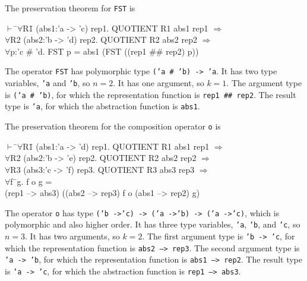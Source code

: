 \documentclass[envcountsame,runningheads]{llncs}
\begin{document}
The preservation theorem for {\tt FST} is
{\tt \begin{tabbing}
\hspace{5.5mm}
    $\vdash$ \=$\forall$R\=1 (abs1:'a -> 'c) rep1. QUOTIENT R1 abs1 rep1 $\Rightarrow$ \\
\>     $\forall$R2 (abs2:'b -> 'd) rep2. QUOTIENT R2 abs2 rep2 $\Rightarrow$ \\
\>\>     $\forall$p:'c \# 'd. FST p = abs1 (FST ((rep1 \#\# rep2) p))
\end{tabbing}}
The operator {\tt FST} has polymorphic type {\tt ('a \# 'b) -> 'a}.
It has two type variables, {\tt 'a} and {\tt 'b}, so $n = 2$.
It has one argument, so $k = 1$.
The argument type is
{\tt ('a \# 'b)},
for which
the representation function
is {\tt rep1 \#\# rep2}.
The result type is
{\tt 'a},
for which
the abstraction function
is {\tt abs1}.

\pagebreak[3]
The preservation theorem for the composition operator {\tt o} is
{\tt \begin{tabbing}
\hspace{5.5mm}
    $\vdash$ \=$\forall$R\=1 (abs1:'a -> 'd) rep1. QUOTIENT R1 abs1 rep1 $\Rightarrow$ \\
\>     $\forall$R2 (abs2:'b -> 'e) rep2. QUOTIENT R2 abs2 rep2 $\Rightarrow$ \\
\>     $\forall$R3 (abs3:'c -> 'f) rep3. QUOTIENT R3 abs3 rep3 $\Rightarrow$ \\
\>\>     $\forall$f\=\ g. f o g = \\
\>\>\>     (rep1 --> abs3) ((abs2 --> rep3) f o (abs1 --> rep2) g)
\end{tabbing}}
The operator {\tt o} has type
{\tt ('b ->\;'c) -> ('a ->\;'b) -> ('a ->\;'c)},
which is polymorphic and also higher order.
It has three type variables, {\tt 'a}, {\tt 'b}, and {\tt 'c}, so $n = 3$.
It has two arguments, so $k = 2$.
The first argument type is
{\tt 'b -> 'c},
for which
the representation function
is {\tt abs2 --> rep3}.
The second argument type is
{\tt 'a -> 'b},
for which
the representation function
is {\tt abs1 --> rep2}.
The result type is
{\tt 'a -> 'c},
for which
the abstraction function
is {\tt rep1 --> abs3}.
\end{document}
